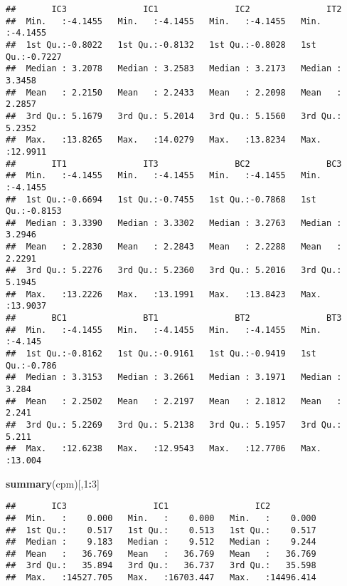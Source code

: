 \documentclass[
]{article}
\newenvironment{Shaded}{\begin{snugshade}}{\end{snugshade}}
\newcommand{\DecValTok}[1]{\textcolor[rgb]{0.00,0.00,0.81}{#1}}
\newcommand{\KeywordTok}[1]{\textcolor[rgb]{0.13,0.29,0.53}{\textbf{#1}}}
\newcommand{\NormalTok}[1]{#1}
\newcommand{\OperatorTok}[1]{\textcolor[rgb]{0.81,0.36,0.00}{\textbf{#1}}}
\begin{document}
\begin{verbatim}
##       IC3               IC1               IC2               IT2         
##  Min.   :-4.1455   Min.   :-4.1455   Min.   :-4.1455   Min.   :-4.1455  
##  1st Qu.:-0.8022   1st Qu.:-0.8132   1st Qu.:-0.8028   1st Qu.:-0.7227  
##  Median : 3.2078   Median : 3.2583   Median : 3.2173   Median : 3.3458  
##  Mean   : 2.2150   Mean   : 2.2433   Mean   : 2.2098   Mean   : 2.2857  
##  3rd Qu.: 5.1679   3rd Qu.: 5.2014   3rd Qu.: 5.1560   3rd Qu.: 5.2352  
##  Max.   :13.8265   Max.   :14.0279   Max.   :13.8234   Max.   :12.9911  
##       IT1               IT3               BC2               BC3         
##  Min.   :-4.1455   Min.   :-4.1455   Min.   :-4.1455   Min.   :-4.1455  
##  1st Qu.:-0.6694   1st Qu.:-0.7455   1st Qu.:-0.7868   1st Qu.:-0.8153  
##  Median : 3.3390   Median : 3.3302   Median : 3.2763   Median : 3.2946  
##  Mean   : 2.2830   Mean   : 2.2843   Mean   : 2.2288   Mean   : 2.2291  
##  3rd Qu.: 5.2276   3rd Qu.: 5.2360   3rd Qu.: 5.2016   3rd Qu.: 5.1945  
##  Max.   :13.2226   Max.   :13.1991   Max.   :13.8423   Max.   :13.9037  
##       BC1               BT1               BT2               BT3        
##  Min.   :-4.1455   Min.   :-4.1455   Min.   :-4.1455   Min.   :-4.145  
##  1st Qu.:-0.8162   1st Qu.:-0.9161   1st Qu.:-0.9419   1st Qu.:-0.786  
##  Median : 3.3153   Median : 3.2661   Median : 3.1971   Median : 3.284  
##  Mean   : 2.2502   Mean   : 2.2197   Mean   : 2.1812   Mean   : 2.241  
##  3rd Qu.: 5.2269   3rd Qu.: 5.2138   3rd Qu.: 5.1957   3rd Qu.: 5.211  
##  Max.   :12.6238   Max.   :12.9543   Max.   :12.7706   Max.   :13.004
\end{verbatim}

\begin{Shaded}
\begin{Highlighting}[]
\KeywordTok{summary}\NormalTok{(cpm)[,}\DecValTok{1}\OperatorTok{:}\DecValTok{3}\NormalTok{]}
\end{Highlighting}
\end{Shaded}

\begin{verbatim}
##       IC3                 IC1                 IC2           
##  Min.   :    0.000   Min.   :    0.000   Min.   :    0.000  
##  1st Qu.:    0.517   1st Qu.:    0.513   1st Qu.:    0.517  
##  Median :    9.183   Median :    9.512   Median :    9.244  
##  Mean   :   36.769   Mean   :   36.769   Mean   :   36.769  
##  3rd Qu.:   35.894   3rd Qu.:   36.737   3rd Qu.:   35.598  
##  Max.   :14527.705   Max.   :16703.447   Max.   :14496.414
\end{verbatim}
\end{document}
